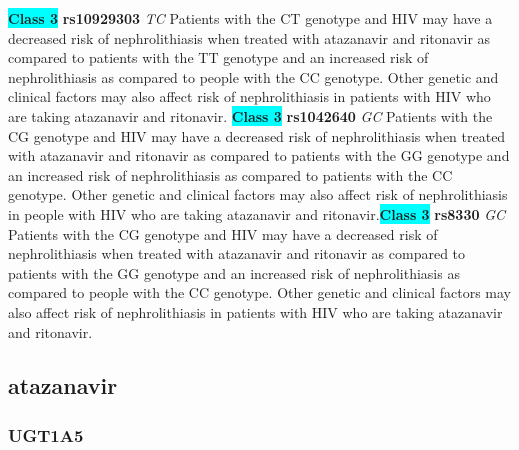 \documentclass{book}
\begin{document}
\begin{center}
\textbf{\colorbox{cyan} {Class 3}} \textbf{ rs10929303 } \textit{ TC }
Patients with the CT genotype and HIV may have a decreased risk of nephrolithiasis when treated with atazanavir and ritonavir as compared to patients with the TT genotype and an increased risk of nephrolithiasis as compared to people with the CC genotype. Other genetic and clinical factors may also affect risk of nephrolithiasis in patients with HIV who are taking atazanavir and ritonavir. \textbf{\colorbox{cyan} {Class 3}} \textbf{ rs1042640 } \textit{ GC }
Patients with the CG genotype and HIV may have a decreased risk of nephrolithiasis when treated with atazanavir and ritonavir as compared to patients with the GG genotype and an increased risk of nephrolithiasis as compared to patients with the CC genotype. Other genetic and clinical factors may also affect risk of nephrolithiasis in people with HIV who are taking atazanavir and ritonavir.\textbf{\colorbox{cyan} {Class 3}} \textbf{ rs8330 } \textit{ GC }
Patients with the CG genotype and HIV may have a decreased risk of nephrolithiasis when treated with atazanavir and ritonavir as compared to patients with the GG genotype and an increased risk of nephrolithiasis as compared to people with the CC genotype. Other genetic and clinical factors may also affect risk of nephrolithiasis in patients with HIV who are taking atazanavir and ritonavir.


\end{center}\subsection{ atazanavir }


\subsubsection{ UGT1A5 }
\end{document}
